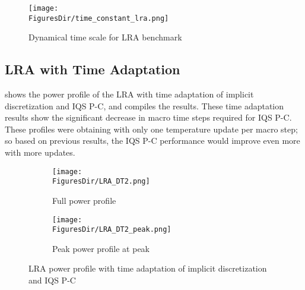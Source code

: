 \begin{figure}[htbp!]
\centering
\texttt{[image: \\FiguresDir/time\_constant\_lra.png]}
\caption{Dynamical time scale for LRA benchmark}
\label{fig:LRAtc}
\end{figure}

\subsection{LRA with Time Adaptation}

 shows the power profile of the LRA with time adaptation of implicit discretization and IQS P-C, and  compiles the results. These time adaptation results show the significant decrease in macro time steps required for IQS P-C. These profiles were obtaining with only one temperature update per macro step; so based on previous results, the IQS P-C performance would improve even more with more updates.

\begin{figure}[!htbp]
\centering
\begin{subfigure}[!htbp]{0.49\textwidth}
\texttt{[image: \\FiguresDir/LRA\_DT2.png]}
\caption{Full power profile}
\end{subfigure}
\begin{subfigure}[!htbp]{0.49\textwidth}
\texttt{[image: \\FiguresDir/LRA\_DT2\_peak.png]}
\caption{Peak power profile at peak}
\end{subfigure}
\caption{LRA power profile with time adaptation of implicit discretization and IQS P-C}
\label{fig:lra_dt2}
\end{figure}

\begin{table}
\begin{center}
\end{center}
\caption{LRA step doubling adaptation results with implicit discretization and IQS P-C}
\label{tab:lra_dt2}
\end{table}



